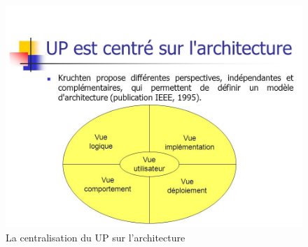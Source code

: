 \documentclass[12 pt]{report}
\begin{document}
\begin{itemize}[font=\color{black} \Large, label=]
\begin{figure}[h]
\begin{center}
\includegraphics[scale=0.5]{u.jpg}
\caption{ La centralisation du UP sur l'architecture}
\end{center}
\end{figure}



\end{itemize}
\end{document}
